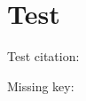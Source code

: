 \documentclass{article}
\begin{document}
\section{Test}
Test citation: \cite{Wilf1990}

Missing key: \cite{r2d2}

\printbibliography
\end{document}
